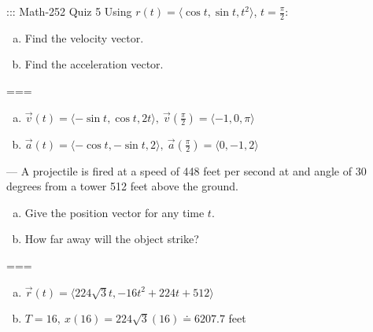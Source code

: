 ::: Math-252 Quiz 5
Using \(r(t)=\langle\cos t,\sin t,t^2\rangle\), \(t=\frac{\pi}{2}\):
\begin{enumerate}[a.]
  \item Find the velocity vector.
  \item Find the acceleration vector.
\end{enumerate}
===
\begin{enumerate}[a.]
  \item \(\vec v(t)=\langle-\sin t,\cos t,2t\rangle,\
    \vec v(\frac{\pi}{2})=\langle-1,0,\pi\rangle\)
  \item \(\vec a(t)=\langle-\cos t,-\sin t,2\rangle,\
    \vec a(\frac{\pi}{2})=\langle0,-1,2\rangle\)
\end{enumerate}
---
A projectile is fired at a speed of 448 feet per second at and angle of 30
degrees from a tower 512 feet above the ground.
\begin{enumerate}[a.]
  \item Give the position vector for any time \(t\).
  \item How far away will the object strike?
\end{enumerate}
===
\begin{enumerate}[a.]
  \item \(\vec r(t)=\langle 224\sqrt{3}t,-16t^2+224t+512\rangle\)
  \item \(T=16,\ x(16)=224\sqrt{3}(16)\doteq 6207.7\) feet
\end{enumerate}


